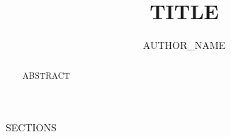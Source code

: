 \documentclass[runningheads]{llncs}
\begin{document}
\title{{{TITLE}}}

\author{{{AUTHOR_NAME}}}

\maketitle

\begin{abstract}
{{ABSTRACT}}
\end{abstract}

{{SECTIONS}}



\end{document}
